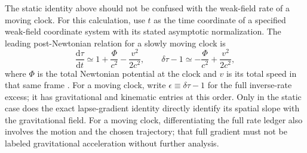 \documentclass[12pt]{article}
\begin{document}
The static identity above should not be confused with the weak-field rate of a moving clock. For this calculation, use $t$ as the time coordinate of a specified weak-field coordinate system with its stated asymptotic normalization. The leading post-Newtonian relation for a slowly moving clock is
\begin{equation}
  \frac{\mathrm{d}\tau}{\mathrm{d}t}
  \simeq1+\frac{\Phi}{c^2}-\frac{v^2}{2c^2},
  \qquad
  \delta\tau-1
  \simeq-\frac{\Phi}{c^2}+\frac{v^2}{2c^2},
  \label{eq:moving-ledger}
\end{equation}
where $\Phi$ is the total Newtonian potential at the clock and $v$ is its total speed in that same frame \cite{IERS}. For a moving clock, write $\epsilon\equiv\delta\tau-1$ for the full inverse-rate excess; it has gravitational and kinematic entries at this order. Only in the static case does the exact lapse-gradient identity directly identify its spatial slope with the gravitational field. For a moving clock, differentiating the full rate ledger also involves the motion and the chosen trajectory; that full gradient must not be labeled gravitational acceleration without further analysis.
\end{document}
